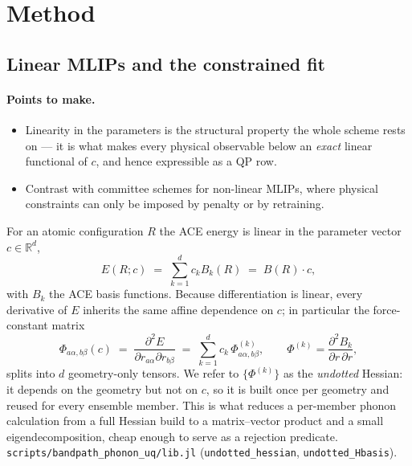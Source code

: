 \documentclass{article}
\newcommand{\code}[1]{\texttt{\small #1}}
\begin{document}
\section{Method}

\subsection{Linear MLIPs and the constrained fit}

\paragraph{Points to make.}
\begin{itemize}
  \item Linearity in the parameters is the structural property the whole scheme rests on --- it is what makes every physical observable below an \emph{exact} linear functional of $c$, and hence expressible as a QP row.
  \item Contrast with committee schemes for non-linear MLIPs, where physical constraints can only be imposed by penalty or by retraining.
\end{itemize}

For an atomic configuration $R$ the ACE energy is linear in the parameter vector
$c \in \mathbb{R}^{d}$,
\begin{equation}
  E(R;c) \;=\; \sum_{k=1}^{d} c_k B_k(R) \;=\; B(R)\cdot c ,
  \label{eq:linear energy}
\end{equation}
with $B_k$ the ACE basis functions. Because differentiation is linear, every
derivative of $E$ inherits the same affine dependence on $c$; in particular the
force-constant matrix
\begin{equation}
  \Phi_{a\alpha,b\beta}(c) \;=\; \frac{\partial^{2}E}{\partial r_{a\alpha}\partial r_{b\beta}}
  \;=\; \sum_{k=1}^{d} c_k\, \Phi^{(k)}_{a\alpha,b\beta},
  \qquad
  \Phi^{(k)} = \frac{\partial^{2}B_k}{\partial r\,\partial r},
  \label{eq:linear hessian}
\end{equation}
splits into $d$ geometry-only tensors. We refer to $\{\Phi^{(k)}\}$ as the
\emph{undotted} Hessian: it depends on the geometry but not on $c$, so it is built
once per geometry and reused for every ensemble member. This is what reduces a
per-member phonon calculation from a full Hessian build to a matrix--vector
product and a small eigendecomposition, cheap enough to serve as a rejection
predicate.
\code{scripts/bandpath\_phonon\_uq/lib.jl}
(\code{undotted\_hessian}, \code{undotted\_Hbasis}).
\end{document}

